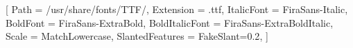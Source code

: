\setsansfont{FiraSans-Regular}[
    Path                    = /usr/share/fonts/TTF/,
    Extension               = .ttf,
    ItalicFont              = FiraSans-Italic,
    BoldFont                = FiraSans-ExtraBold,
    BoldItalicFont          = FiraSans-ExtraBoldItalic,
    Scale                   = MatchLowercase,
    SlantedFeatures         = {FakeSlant=0.2},
]



